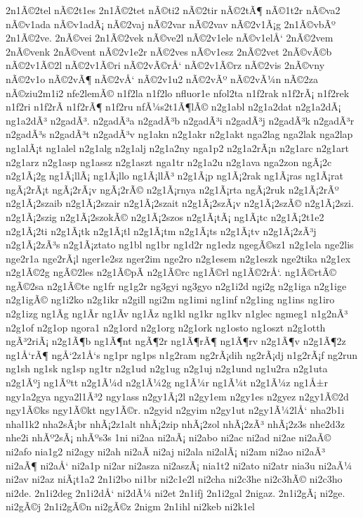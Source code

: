 {2n1Ã©2tel
nÃ©2t1es
2n1Ã©2tet
nÃ©ti2
nÃ©2tir
nÃ©2tÃ¶
nÃ©1t2r
nÃ©va2
nÃ©v1ada
nÃ©v1adÃ¡
nÃ©2vaj
nÃ©2var
nÃ©2vav
nÃ©2v1Ã¡g
2n1Ã©vbÃº
2n1Ã©2ve.
2nÃ©vei
2n1Ã©2vek
nÃ©ve2l
nÃ©2v1ele
nÃ©v1elÅ‘
2nÃ©2vem
2nÃ©venk
2nÃ©vent
nÃ©2v1e2r
nÃ©2ves
nÃ©v1esz
2nÃ©2vet
2nÃ©vÃ©b
nÃ©2v1Ã©2l
nÃ©2v1Ã©ri
nÃ©2vÃ©rÅ‘
nÃ©2v1Ã©rz
nÃ©2vis
2nÃ©vny
nÃ©2v1o
nÃ©2vÃ¶
nÃ©2vÅ‘
nÃ©2v1u2
nÃ©2vÃº
nÃ©2vÃ¼n
nÃ©2za
nÃ©ziu2m1i2
nfe2lemÃ©
n1f2la
n1f2lo
nfluor1e
nfol2ta
n1f2rak
n1f2rÃ¡
n1f2rek
n1f2ri
n1f2rÃ­
n1f2rÃ¶
n1f2ru
nfÃ¼s2t1Ã¶lÃ©
n2g1abl
n2g1a2dat
n2g1a2dÃ¡
ng1a2dÃ³
n2gadÃ³.
n2gadÃ³a
n2gadÃ³b
n2gadÃ³i
n2gadÃ³j
n2gadÃ³k
n2gadÃ³r
n2gadÃ³s
n2gadÃ³t
n2gadÃ³v
ng1akn
n2g1akr
n2g1akt
nga2lag
nga2lak
nga2lap
ng1alÃ¡t
ng1alel
n2g1alg
n2g1alj
n2g1a2ny
nga1p2
n2g1a2rÃ¡n
n2g1arc
n2g1art
n2g1arz
n2g1asp
ng1assz
n2g1aszt
nga1tr
n2g1a2u
n2g1ava
nga2zon
ngÃ¡2c
n2g1Ã¡2g
ng1Ã¡llÃ¡
ng1Ã¡llo
ng1Ã¡llÃ³
n2g1Ã¡p
ng1Ã¡2rak
ng1Ã¡ras
ng1Ã¡rat
ngÃ¡2rÃ¡t
ngÃ¡2rÃ¡v
ngÃ¡2rÃ©
n2g1Ã¡rnya
n2g1Ã¡rta
ngÃ¡2ruk
n2g1Ã¡2rÃº
n2g1Ã¡2szaib
n2g1Ã¡2szair
n2g1Ã¡2szait
n2g1Ã¡2szÃ¡v
n2g1Ã¡2szÃ©
n2g1Ã¡2szi.
n2g1Ã¡2szig
n2g1Ã¡2szokÃ©
n2g1Ã¡2szos
n2g1Ã¡tÃ¡
ng1Ã¡tc
n2g1Ã¡2t1e2
n2g1Ã¡2ti
n2g1Ã¡tk
n2g1Ã¡tl
n2g1Ã¡tm
n2g1Ã¡ts
n2g1Ã¡tv
n2g1Ã¡2zÃ³j
n2g1Ã¡2zÃ³s
n2g1Ã¡ztato
ng1bl
ng1br
ng1d2r
ng1edz
ngegÃ©sz1
n2g1ela
nge2lis
nge2r1a
nge2rÃ¡l
nger1e2sz
nger2im
nge2ro
n2g1esem
n2g1eszk
nge2tika
n2g1ex
n2g1Ã©2g
ngÃ©2les
n2g1Ã©pÃ­
n2g1Ã©rc
ng1Ã©rl
ng1Ã©2rÅ‘.
ng1Ã©rtÃ©
ngÃ©2sa
n2g1Ã©te
ng1fr
ng1g2r
ng3gyi
ng3gyo
n2g1i2d
ngi2g
n2g1iga
n2g1ige
n2g1igÃ©
ng1i2ko
n2g1ikr
n2gill
ngi2m
ng1imi
ng1inf
n2g1ing
ng1ins
ng1iro
n2g1izg
ng1Ã­g
ng1Ã­r
ng1Ã­v
ng1Ã­z
ng1kl
ng1kr
ng1kv
n1glec
ngmeg1
n1g2nÃ³
n2g1of
n2g1op
ngora1
n2g1ord
n2g1org
n2g1ork
ng1osto
ng1oszt
n2g1otth
ngÃ³2riÃ¡
n2g1Ã¶b
ng1Ã¶nt
ngÃ¶2r
ng1Ã¶rÃ¶
ng1Ã¶rv
n2g1Ã¶v
n2g1Ã¶2z
ng1Å‘rÃ¶
ngÅ‘2z1Å‘s
ng1pr
ng1ps
n1g2ram
ng2rÃ¡dih
ng2rÃ¡dj
n1g2rÃ¡f
ng2run
ng1sh
ng1sk
ng1sp
ng1tr
n2g1ud
n2g1ug
n2g1uj
n2g1und
ng1u2ra
n2g1uta
n2g1Ãºj
ng1Ãºtt
n2g1Ã¼d
n2g1Ã¼2g
ng1Ã¼r
ng1Ã¼t
n2g1Ã¼z
ng1Å±r
ngy1a2gya
ngya2l1Ã³2
ngy1ass
n2gy1Ã¡2l
n2gy1em
n2gy1es
n2gyez
n2gy1Ã©2d
ngy1Ã©ks
ngy1Ã©kt
ngy1Ã©r.
n2gyid
n2gyim
n2gy1ut
n2gy1Ã¼2lÅ‘
nha2b1i
nhal1k2
nha2sÃ¡br
nhÃ¡2z1alt
nhÃ¡2zip
nhÃ¡2zol
nhÃ¡2zÃ³
nhÃ¡2z3s
nhe2d3z
nhe2i
nhÃº2sÃ¡
nhÃºs3s
1ni
ni2aa
ni2aÃ¡
ni2abo
ni2ac
ni2ad
ni2ae
ni2aÃ©
ni2afo
nia1g2
ni2agy
ni2ah
ni2aÃ­
ni2aj
ni2ala
ni2alÃ¡
ni2am
ni2ao
ni2aÃ³
ni2aÃ¶
ni2aÅ‘
ni2a1p
ni2ar
ni2asza
ni2aszÃ¡
nia1t2
ni2ato
ni2atr
nia3u
ni2aÃ¼
ni2av
ni2az
niÃ¡t1a2
2n1i2bo
ni1br
ni2c1e2l
ni2cha
ni2c3he
ni2c3hÃ©
ni2c3ho
ni2de.
2n1i2deg
2n1i2dÅ‘
ni2dÃ¼
ni2et
2n1ifj
2n1i2gal
2nigaz.
2n1i2gÃ¡
ni2ge.
ni2gÃ©j
2n1i2gÃ©n
ni2gÃ©z
2nigm
2n1ihl
ni2keb
ni2k1el
}
